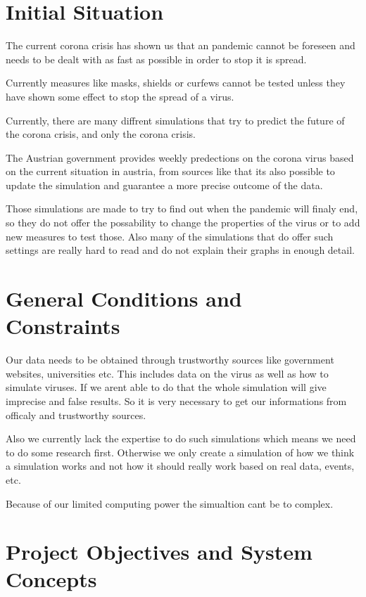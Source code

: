 \documentclass[12pt]{article}
\theoremstyle{definition}
\begin{document}
\pagebreak

\section{Initial Situation}

The current corona crisis has shown us that an pandemic cannot be foreseen and needs to be dealt with as fast as possible in order to stop it is spread.

Currently measures like masks, shields or curfews cannot be tested unless they have shown some effect to stop the spread of a virus.

Currently, there are many diffrent simulations that try to predict the future of the corona crisis,
and only the corona crisis. 

The Austrian government provides weekly predections on the corona virus based on the current situation in austria, from sources like that its also possible to update the simulation and guarantee a more precise outcome of the data.

Those simulations are made to try to find out when the pandemic will finaly end,
so they do not offer the possability to change the properties of the virus or to add new measures to test those.
Also many of the simulations that do offer such settings are really hard to read and do not explain their graphs in enough detail.

\pagebreak

\section{General Conditions and Constraints}

Our data needs to be obtained through trustworthy sources like government websites, universities etc.
This includes data on the virus as well as how to simulate viruses.
If we arent able to do that the whole simulation will give imprecise and false results.
So it is very necessary to get our informations from officaly and trustworthy sources. 

Also we currently lack the expertise to do such simulations which means we need to do some research first.
Otherwise we only create a simulation of how we think a simulation works and not how it should really work based on real data, events, etc.

Because of our limited computing power the simualtion cant be to complex.
\pagebreak

\section{Project Objectives and System Concepts}
\end{document}
